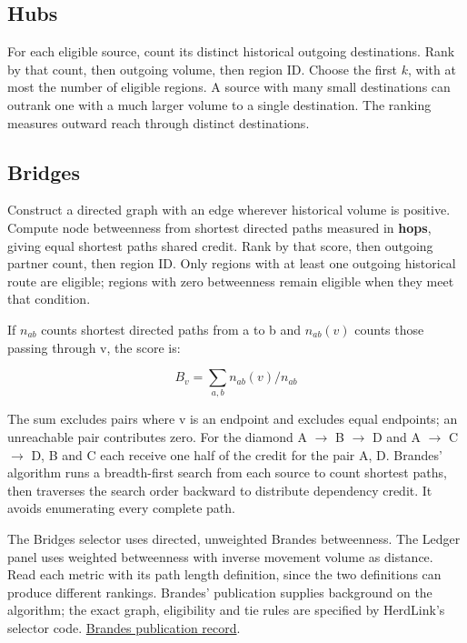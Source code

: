 \documentclass[11pt,a4paper]{article}
\begin{document}
\subsection{Hubs}\label{hubs}

For each eligible source, count its distinct historical outgoing
destinations. Rank by that count, then outgoing volume, then region ID.
Choose the first \(k\), with at most the number of eligible regions. A
source with many small destinations can outrank one with a much larger
volume to a single destination. The ranking measures outward reach
through distinct destinations.

\subsection{Bridges}\label{bridges}

Construct a directed graph with an edge wherever historical volume is
positive. Compute node betweenness from shortest directed paths measured
in \textbf{hops}, giving equal shortest paths shared credit. Rank by
that score, then outgoing partner count, then region ID. Only regions
with at least one outgoing historical route are eligible; regions with
zero betweenness remain eligible when they meet that condition.

If \(n_{ab}\) counts shortest directed paths from a to b and
\(n_{ab}(v)\) counts those passing through v, the score is:

\[
B_v=\sum_{a,b} n_{ab}(v)/n_{ab}
\]

The sum excludes pairs where v is an endpoint and excludes equal
endpoints; an unreachable pair contributes zero. For the diamond A \ensuremath{\rightarrow} B \ensuremath{\rightarrow}
D and A \ensuremath{\rightarrow} C \ensuremath{\rightarrow} D, B and C each receive one half of the credit for the
pair A, D. Brandes' algorithm runs a breadth-first search from each
source to count shortest paths, then traverses the search order backward
to distribute dependency credit. It avoids enumerating every complete
path.

The Bridges selector uses directed, unweighted Brandes betweenness. The
Ledger panel uses weighted betweenness with inverse movement volume as
distance. Read each metric with its path length definition, since the
two definitions can produce different rankings. Brandes' publication
supplies background on the algorithm; the exact graph, eligibility and
tie rules are specified by HerdLink's selector code.
\href{https://doi.org/10.1080/0022250X.2001.9990249}{Brandes publication
record}.
\end{document}
